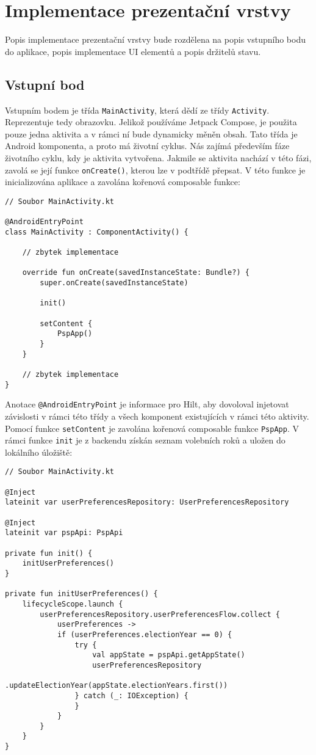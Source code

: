 \section {Implementace prezentační vrstvy}
Popis implementace prezentační vrstvy bude rozdělena na popis vstupního bodu do aplikace, popis implementace UI elementů a popis držitelů stavu.

\subsection*{Vstupní bod}
Vstupním bodem je třída \lstinline|MainActivity|, která dědí ze třídy \lstinline|Activity|. Reprezentuje tedy obrazovku. Jelikož používáme Jetpack Compose, je použita pouze jedna aktivita a v rámci ní bude dynamicky měněn obsah. Tato třída je Android komponenta, a proto má životní cyklus. Nás zajímá především fáze životního cyklu, kdy je aktivita vytvořena. Jakmile se aktivita nachází v této fázi, zavolá se její funkce \lstinline|onCreate()|, kterou lze v podtřídě přepsat. V této funkce je inicializována aplikace a zavolána kořenová composable funkce:

\begin{lstlisting}[caption={Třída activity}, tabsize=2]
// Soubor MainActivity.kt

@AndroidEntryPoint
class MainActivity : ComponentActivity() {
	
	// zbytek implementace
	
	override fun onCreate(savedInstanceState: Bundle?) {
		super.onCreate(savedInstanceState)
		
		init()
		
		setContent {
			PspApp()
		}
	}

	// zbytek implementace
}
\end{lstlisting}

\noindent Anotace \lstinline|@AndroidEntryPoint| je informace pro Hilt, aby dovoloval injetovat závislosti v rámci této třídy a všech komponent existujících v rámci této aktivity. Pomocí funkce \lstinline|setContent| je zavolána kořenová composable funkce \lstinline|PspApp|. V rámci funkce \lstinline|init| je z backendu získán seznam volebních roků a uložen do lokálního úložiště:

\begin{lstlisting}[caption={Třída activity}, tabsize=2]
// Soubor MainActivity.kt

@Inject
lateinit var userPreferencesRepository: UserPreferencesRepository

@Inject
lateinit var pspApi: PspApi

private fun init() {
	initUserPreferences()
}

private fun initUserPreferences() {
	lifecycleScope.launch {
		userPreferencesRepository.userPreferencesFlow.collect { 
			userPreferences ->
			if (userPreferences.electionYear == 0) {
				try {
					val appState = pspApi.getAppState()
					userPreferencesRepository
						.updateElectionYear(appState.electionYears.first())
				} catch (_: IOException) {
				}
			}
		}
	}
}
\end{lstlisting}

